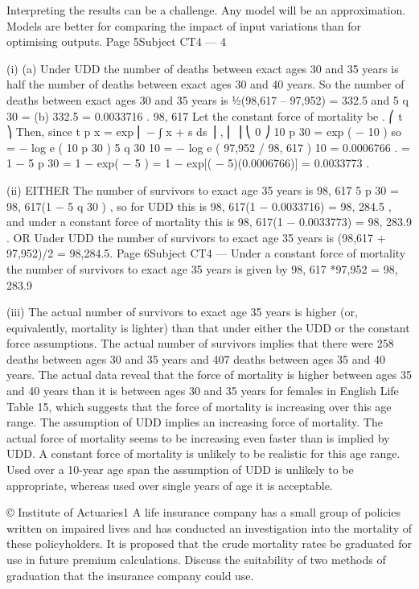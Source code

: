 Interpreting the results can be a challenge.
Any model will be an approximation.
Models are better for comparing the impact of input variations than for optimising
outputs.
Page 5Subject CT4 — %
4
\item (i)
(a)
Under UDD the number of deaths between exact ages 30 and 35 years
is half the number of deaths between exact ages 30 and 40 years.
So the number of deaths between exact ages 30 and 35 years is
1⁄2(98,617 – 97,952) = 332.5
and 5 q 30 =
(b)
332.5
= 0.0033716 .
98, 617
Let the constant force of mortality be \mu.
⎛ t
⎞
Then, since t p x = exp ⎜ − ∫ \mu x + s ds ⎟ ,
⎜
⎟
⎝ 0
⎠
10 p 30 = exp ( − 10 \mu )
so
\mu=
− log e ( 10 p 30 )
5 q 30
10
=
− log e ( 97,952 / 98, 617 )
10
= 0.0006766 .
= 1 − 5 p 30 = 1 − exp( − 5 \mu )
= 1 − exp[( − 5)(0.0006766)] = 0.0033773 .
\item (ii)
EITHER
The number of survivors to exact age 35 years is
98, 617 5 p 30 = 98, 617(1 − 5 q 30 ) ,
so for UDD this is
98, 617(1 − 0.0033716) = 98, 284.5 ,
and under a constant force of mortality this is
98, 617(1 − 0.0033773) = 98, 283.9 .
OR
Under UDD the number of survivors to exact age 35 years is
(98,617 + 97,952)/2 = 98,284.5.
Page 6Subject CT4 — %
Under a constant force of mortality the number of survivors to
exact age 35 years is given by
98, 617 *97,952 = 98, 283.9
\item (iii)
The actual number of survivors to exact age 35 years is higher (or,
equivalently, mortality is lighter) than that under either the UDD or the
constant force assumptions.
The actual number of survivors implies that there were 258 deaths between
ages 30 and 35 years and 407 deaths between ages 35 and 40 years.
The actual data reveal that the force of mortality is higher between ages 35 and
40 years than it is between ages 30 and 35 years for females in English Life
Table 15, which suggests that the force of mortality is increasing over this age
range.
The assumption of UDD implies an increasing force of mortality.
The actual force of mortality seems to be increasing even faster than is implied
by UDD.
A constant force of mortality is unlikely to be realistic for this age range.
Used over a 10-year age span the assumption of UDD is unlikely to be
appropriate, whereas used over single years of age it is acceptable.


\newpage

© Institute of Actuaries1
A life insurance company has a small group of policies written on impaired lives and
has conducted an investigation into the mortality of these policyholders. It is
proposed that the crude mortality rates be graduated for use in future premium
calculations.
Discuss the suitability of two methods of graduation that the insurance company could
use.

